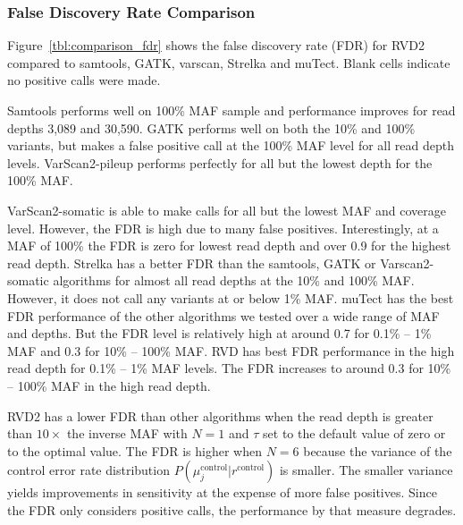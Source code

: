 \documentclass{bioinfo}
\begin{document}
\subsubsection*{False Discovery Rate Comparison}

Figure~\ref{tbl:comparison_fdr} shows the false discovery rate (FDR) for RVD2 compared to samtools, GATK, varscan, Strelka and muTect. 
Blank cells indicate no positive calls were made.

Samtools performs well on 100\% MAF sample and performance improves for read depths 3,089 and 30,590. 
GATK performs well on both the 10\% and 100\% variants, but makes a false positive call at the 100\% MAF level for all read depth levels. 
VarScan2-pileup performs perfectly for all but the lowest depth for the 100\% MAF.

VarScan2-somatic is able to make calls for all but the lowest MAF and coverage level. 
However, the FDR is high due to many false positives. Interestingly, at a MAF of 100\% the FDR is zero for lowest read depth and over 0.9 for the highest read depth. 
Strelka has a better FDR than the samtools, GATK or Varscan2-somatic algorithms for almost all read depths at the 10\% and 100\% MAF. 
However, it does not call any variants at or below 1\% MAF.  muTect has the best FDR performance of the other algorithms we tested over a wide range of MAF and depths. But the FDR level is relatively high at around 0.7 for 0.1\% -- 1\% MAF and 0.3 for 10\% -- 100\% MAF. 
RVD has best FDR performance in the high read depth for 0.1\% -- 1\% MAF levels. 
The FDR increases to around 0.3 for 10\% -- 100\% MAF in the high read depth.

RVD2 has a lower FDR than other algorithms when the read depth is greater than $10\times$ the inverse MAF with $N=1$ and $\tau$ set to the default value of zero or to the optimal value. 
The FDR is higher when $N=6$ because the variance of the control error rate distribution $P(\mu_j^{\text{control}} | r^{\text{control}})$ is smaller. The smaller variance yields improvements in sensitivity at the expense of more false positives. 
Since the FDR only considers positive calls, the performance by that measure degrades.

\vspace{-10pt}
\end{document}
